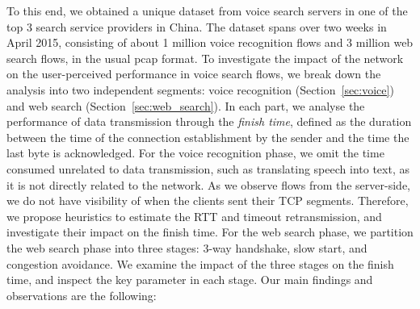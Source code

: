 To this end, we obtained a unique dataset from voice search servers in one of the top 3 search service providers in China. The dataset spans over two weeks in April 2015, consisting of about 1 million voice recognition flows and 3 million web search flows, in the usual pcap format. To investigate the impact of the network on the user-perceived performance in voice search flows, we break down the analysis into two independent segments: voice recognition (Section~\ref{sec:voice}) and web search (Section~\ref{sec:web_search}). In each part, we analyse the performance of data transmission through the \textit{finish time}, defined as the duration between the time of the connection establishment by the sender and the time the last byte is acknowledged. For the voice recognition phase, we omit the time consumed unrelated to data transmission, such as translating speech into text, as it is not directly related to the network. As we observe flows from the server-side, we do not have visibility of when the clients sent their TCP segments. Therefore, we propose heuristics to estimate the RTT and timeout retransmission, and investigate their impact on the finish time. For the web search phase, we partition the web search phase into three stages: 3-way handshake, slow start, and congestion avoidance. We examine the impact of the three stages on the finish time, and inspect the key parameter in each stage. Our main findings and observations are the following:

